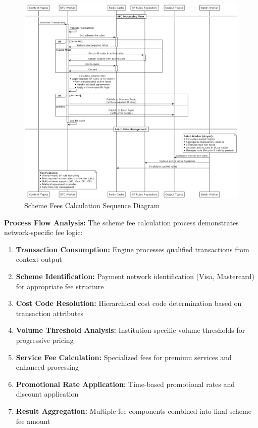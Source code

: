 \begin{figure}[H]
    \centering
    \includegraphics[width=1.05\textwidth]{out/diagrams/plantuml/in/sf-sequence/P2S Scheme Fee Calculation Process.png}
    \caption{Scheme Fees Calculation Sequence Diagram}
    \label{fig:scheme_fees_calculation_sequence}
\end{figure}

\textbf{Process Flow Analysis:}
The scheme fee calculation process demonstrates network-specific fee logic:

\begin{enumerate}
    \item \textbf{Transaction Consumption:} Engine processes qualified transactions from context output
    \item \textbf{Scheme Identification:} Payment network identification (Visa, Mastercard) for appropriate fee structure
    \item \textbf{Cost Code Resolution:} Hierarchical cost code determination based on transaction attributes
    \item \textbf{Volume Threshold Analysis:} Institution-specific volume thresholds for progressive pricing
    \item \textbf{Service Fee Calculation:} Specialized fees for premium services and enhanced processing
    \item \textbf{Promotional Rate Application:} Time-based promotional rates and discount application
    \item \textbf{Result Aggregation:} Multiple fee components combined into final scheme fee amount
\end{enumerate}

